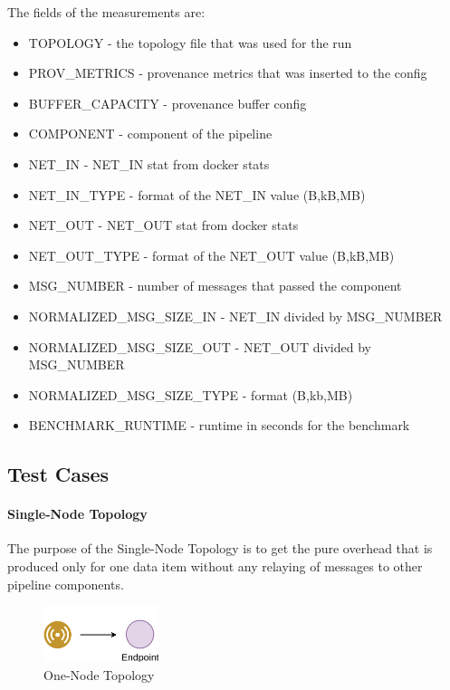 The fields of the measurements are:

\begin{itemize}
\item TOPOLOGY - the topology file that was used for the run
\item PROV\_METRICS - provenance metrics that was inserted to the config
\item BUFFER\_CAPACITY - provenance buffer config
\item COMPONENT - component of the pipeline
\item NET\_IN - NET\_IN stat from docker stats
\item NET\_IN\_TYPE - format of the NET\_IN value (B,kB,MB) 
\item NET\_OUT - NET\_OUT stat from docker stats
\item NET\_OUT\_TYPE - format of the NET\_OUT value (B,kB,MB) 
\item MSG\_NUMBER - number of messages that passed the component
\item NORMALIZED\_MSG\_SIZE\_IN - NET\_IN divided by MSG\_NUMBER
\item NORMALIZED\_MSG\_SIZE\_OUT - NET\_OUT divided by MSG\_NUMBER
\item NORMALIZED\_MSG\_SIZE\_TYPE - format (B,kb,MB)
\item BENCHMARK\_RUNTIME - runtime in seconds for the benchmark
\end{itemize}



\subsection{Test Cases}
\paragraph*{Single-Node Topology}
The purpose of the Single-Node Topology is to get the pure overhead that is produced only for one data item without any relaying of messages to other pipeline components.

\begin{figure}[H]
	\center
	\includegraphics[width=0.3\textwidth]{figures/dataoverheadtopolabeled0.png}
	\caption{One-Node Topology}
	\label{fig:onetodetopology}
\end{figure}

